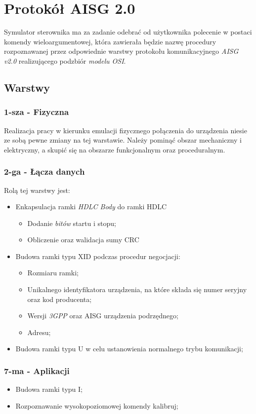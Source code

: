 \chapter{Protokół AISG 2.0}
	Symulator sterownika ma za zadanie odebrać od użytkownika polecenie w postaci komendy wieloargumentowej, 
	która zawierała będzie nazwę procedury rozpoznawanej przez odpowiednie warstwy protokołu komunikacyjnego \textit{AISG v2.0}
	realizującego podzbiór \textit{modelu OSI}\cite{ModelOSI}.
	
	\section{Warstwy}
		\subsection{1-sza - Fizyczna}
		Realizacja pracy w kierunku emulacji fizycznego połączenia do urządzenia niesie ze sobą pewne zmiany na tej warstawie.\newline
		Należy pominąć obszar mechaniczny i elektryczny\cite{ETSI-3GPP-0}, a skupić się na obszarze funkcjonalnym oraz proceduralnym.
		\subsection{2-ga - Łącza danych}
		Rolą tej warstwy jest:
		\begin{itemize}
			\item Enkapsulacja\cite{ENKAPSULACJA} ramki \textit{HDLC Body} do ramki HDLC\cite{WIKI_ENG_HDLC}
			\begin{itemize}
				\item Dodanie \textit{bitów} startu i stopu;
				\item Obliczenie oraz walidacja sumy CRC\cite{CRC}
			\end{itemize}
			\item Budowa ramki typu XID podczas procedur negocjacji:
			\begin{itemize}
				\item Rozmiaru ramki;
				\item Unikalnego identyfikatora urządzenia, na które składa się numer seryjny oraz kod producenta;
				\item Wersji \textit{3GPP} oraz AISG urządzenia podrzędnego;
				\item Adresu;
			\end{itemize}
			\item Budowa ramki typu U w celu ustanowienia normalnego trybu komunikacji;
		\end{itemize}
		\subsection{7-ma - Aplikacji}
			\begin{itemize}
				\item Budowa ramki typu I;
				\item Rozpoznawanie wysokopoziomowej komendy kalibruj;
			\end{itemize}
